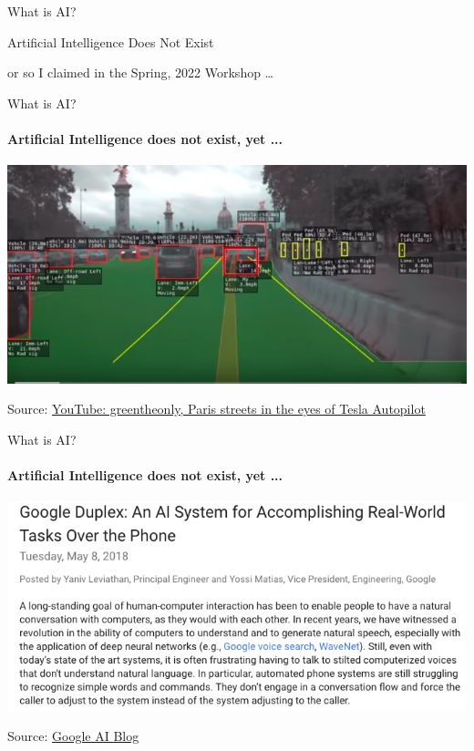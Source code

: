 \begin{frame}[c]{What is AI?}
  \begin{center}
    \huge Artificial Intelligence Does Not Exist
  \end{center}

\vspace{0.5\textheight}
or so I claimed in the Spring, 2022 Workshop \ldots
\end{frame}

\begin{frame}{What is AI?}
  \framesubtitle{Artificial Intelligence does not exist, yet ...}
  \includegraphics[width=\textwidth]{graphics/tesla_paris}

  Source: \href{https://www.youtube.com/watch?v=_1MHGUC_BzQs}{YouTube: greentheonly, Paris streets in the eyes of Tesla Autopilot}
  \end{frame}

  \begin{frame}{What is AI?}
  \framesubtitle{Artificial Intelligence does not exist, yet ...}
  \includegraphics[width=\textwidth]{graphics/google_duplex}

  Source: \href{https://ai.googleblog.com/2018/05/duplex-ai-system-for-natural-conversation.html}{Google AI Blog}
\end{frame}

